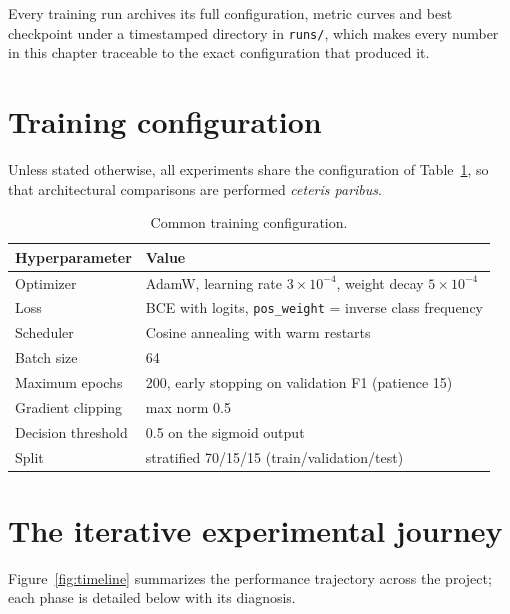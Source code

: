 Every training run archives its full configuration, metric curves and best checkpoint under a timestamped directory in \texttt{runs/}, which makes every number in this chapter traceable to the exact configuration that produced it.

\section{Training configuration}
\label{sec:training-config}

Unless stated otherwise, all experiments share the configuration of Table~\ref{tab:hyperparams}, so that architectural comparisons are performed \emph{ceteris paribus}.

\begin{table}[H]
\centering
\caption{Common training configuration.}
\label{tab:hyperparams}
\renewcommand{\arraystretch}{1.3}
\small
\begin{tabular}{|l|l|}
\hline
\textbf{Hyperparameter} & \textbf{Value} \\
\hline
Optimizer & AdamW, learning rate $3 \times 10^{-4}$, weight decay $5 \times 10^{-4}$ \\
\hline
Loss & BCE with logits, \texttt{pos\_weight} = inverse class frequency \\
\hline
Scheduler & Cosine annealing with warm restarts \\
\hline
Batch size & 64 \\
\hline
Maximum epochs & 200, early stopping on validation F1 (patience 15) \\
\hline
Gradient clipping & max norm 0.5 \\
\hline
Decision threshold & 0.5 on the sigmoid output \\
\hline
Split & stratified 70/15/15 (train/validation/test) \\
\hline
\end{tabular}
\end{table}

\section{The iterative experimental journey}
\label{sec:journey}

Figure~\ref{fig:timeline} summarizes the performance trajectory across the project; each phase is detailed below with its diagnosis.

